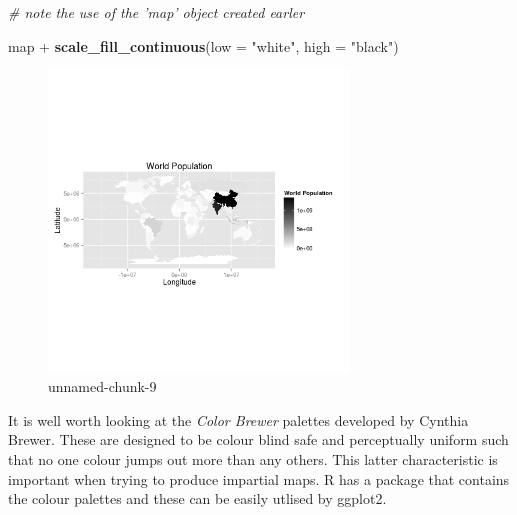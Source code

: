 \documentclass[]{article}
\newenvironment{Shaded}{}{}
\newcommand{\KeywordTok}[1]{\textcolor[rgb]{0.00,0.44,0.13}{\textbf{{#1}}}}
\newcommand{\DataTypeTok}[1]{\textcolor[rgb]{0.56,0.13,0.00}{{#1}}}
\newcommand{\StringTok}[1]{\textcolor[rgb]{0.25,0.44,0.63}{{#1}}}
\newcommand{\CommentTok}[1]{\textcolor[rgb]{0.38,0.63,0.69}{\textit{{#1}}}}
\newcommand{\NormalTok}[1]{{#1}}
\let\Oldincludegraphics\includegraphics
\renewcommand{\includegraphics}[1]{\Oldincludegraphics[width=8cm]{#1}}
\begin{document}
\begin{Shaded}
\begin{Highlighting}[]
\CommentTok{# note the use of the 'map' object created earler}

\NormalTok{map + }\KeywordTok{scale_fill_continuous}\NormalTok{(}\DataTypeTok{low =} \StringTok{"white"}\NormalTok{, }\DataTypeTok{high =} \StringTok{"black"}\NormalTok{)}
\end{Highlighting}
\end{Shaded}
\begin{figure}[htbp]
\centering
\includegraphics{figure/unnamed-chunk-9.png}
\caption{unnamed-chunk-9}
\end{figure}

It is well worth looking at the \emph{Color Brewer} palettes developed
by Cynthia Brewer. These are designed to be colour blind safe and
perceptually uniform such that no one colour jumps out more than any
others. This latter characteristic is important when trying to produce
impartial maps. R has a package that contains the colour palettes and
these can be easily utlised by ggplot2.
\end{document}
